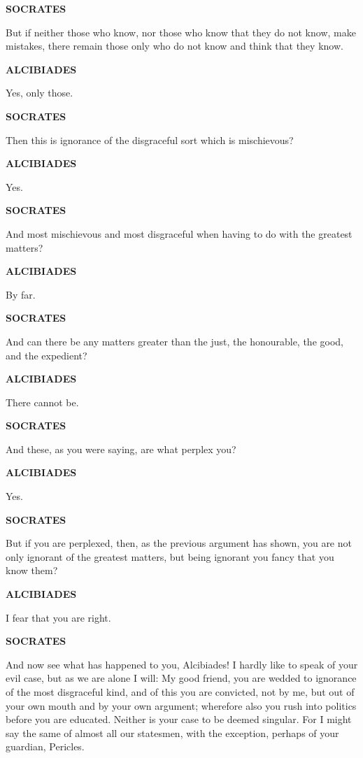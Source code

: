 \documentclass[11pt,letter]{article}
\begin{document}
\par \textbf{SOCRATES}
\par   But if neither those who know, nor those who know that they do not know, make mistakes, there remain those only who do not know and think that they know.

\par \textbf{ALCIBIADES}
\par   Yes, only those.

\par \textbf{SOCRATES}
\par   Then this is ignorance of the disgraceful sort which is mischievous?

\par \textbf{ALCIBIADES}
\par   Yes.

\par \textbf{SOCRATES}
\par   And most mischievous and most disgraceful when having to do with the greatest matters?

\par \textbf{ALCIBIADES}
\par   By far.

\par \textbf{SOCRATES}
\par   And can there be any matters greater than the just, the honourable, the good, and the expedient?

\par \textbf{ALCIBIADES}
\par   There cannot be.

\par \textbf{SOCRATES}
\par   And these, as you were saying, are what perplex you?

\par \textbf{ALCIBIADES}
\par   Yes.

\par \textbf{SOCRATES}
\par   But if you are perplexed, then, as the previous argument has shown, you are not only ignorant of the greatest matters, but being ignorant you fancy that you know them?

\par \textbf{ALCIBIADES}
\par   I fear that you are right.

\par \textbf{SOCRATES}
\par   And now see what has happened to you, Alcibiades! I hardly like to speak of your evil case, but as we are alone I will:  My good friend, you are wedded to ignorance of the most disgraceful kind, and of this you are convicted, not by me, but out of your own mouth and by your own argument; wherefore also you rush into politics before you are educated. Neither is your case to be deemed singular. For I might say the same of almost all our statesmen, with the exception, perhaps of your guardian, Pericles.
\end{document}
